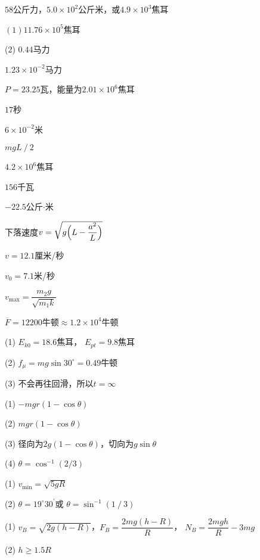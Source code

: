 \achapter

\answer $ 58 $公斤力，$ 5.0\times 10^2 $公斤米，或$ 4.9\times 10 ^3$焦耳

\answer $ (1) 11.76\times 1 0 ^ { 5 } $焦耳

(2) $ 0.44 $马力

\answer $ 1 . 2 3 \times 1 0 ^ { -2 } $马力

\answer $ P = 2 3 . 2 5 $瓦，能量为$ 2.01\times 10 ^ 6 $焦耳

\answer $ 17 $秒

\answer $ 6 \times 1 0 ^ { - 2 } $米

\answer $ m g L \operatorname{/} 2 $

\answer $ 4 . 2 \times 1 0 ^ { 6 } $焦耳

\answer $ 156 $千瓦

\answer $ -22.5 $公斤$ \cdot $米

\addtocounter{answer}{2}
\answer 下落速度$v=\sqrt{g\Bigl(L-\dfrac{a^{2}}{L}\Bigr)}$

\answer $ v = 1 2 . 1 $厘米/秒


\answer $ v _ { 0 } = 7 . 1 $米/秒

\answer
$ v _ { \text{max} } = \dfrac { m _ { 2 } g } { \sqrt { m _ { 1 } k } } $

\answer $ \overline { F } = 1 2 2 0 0 $牛顿$ \approx 1.2\times 10 ^ 4 $牛顿

\answer (1) $ E _ { k 0 } = 1 8 . 6 $焦耳， $ E _ { pt } = 9 . 8 $焦耳

(2) $ f _ { \mu } = m g \sin 3 0 ^ { \circ } = 0 . 4 9 $牛顿

(3) 不会再往回滑，所以$ t = \infty $

\answer (1) $ - m g r \left( 1 - \cos \theta \right) $

(2) $ m g r \left( 1 - \cos \theta \right) $

(3) 径向为$ 2 g \left( 1 - \cos \theta \right) $，切向为$ g \sin \theta $

(4) $ \theta = \cos ^ { - 1 } \left( 2 / 3 \right) $

\answer (1) $ v _ { \text{min} } = \sqrt { 5 g R } $

(2) $ \theta = 1 9 ^ { \circ } 3 0 ^ { \prime } $或 $ \theta = \sin ^ { - 1 } \left( 1 \operatorname{/} 3 \right) $

\answer (1) $ v _ { B } = \sqrt { 2 g \left( h - R \right) } $，$ F _ { B } = \dfrac { 2 m g \left( h - R \right) } {R} $，
$ N _ { B } = \dfrac { 2 m g h } { R } - 3 m g $

(2) $ h \geqslant 1 . 5 R $

